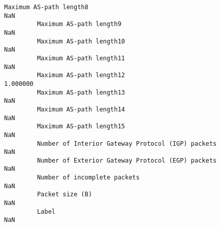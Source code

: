 \documentclass[11pt]{article}
\begin{document}
\begin{Verbatim}[commandchars=\\\{\}]
         Maximum AS-path length8                                                 NaN   
         Maximum AS-path length9                                                 NaN   
         Maximum AS-path length10                                                NaN   
         Maximum AS-path length11                                                NaN   
         Maximum AS-path length12                                           1.000000   
         Maximum AS-path length13                                                NaN   
         Maximum AS-path length14                                                NaN   
         Maximum AS-path length15                                                NaN   
         Number of Interior Gateway Protocol (IGP) packets                       NaN   
         Number of Exterior Gateway Protocol (EGP) packets                       NaN   
         Number of incomplete packets                                            NaN   
         Packet size (B)                                                         NaN   
         Label                                                                   NaN   
         

\end{Verbatim}
\end{document}
